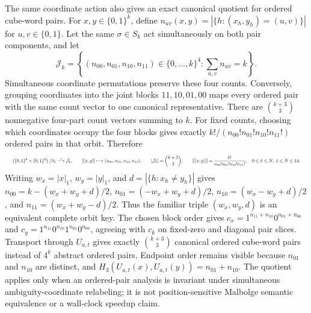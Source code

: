 \documentclass{article}
\newcommand{\fitmath}[1]{\resizebox{0.99\linewidth}{!}{$\displaystyle #1$}}
\begin{document}
The same coordinate action also gives an exact canonical quotient for ordered
cube-word pairs. For $x,y\in\{0,1\}^k$, define
$n_{uv}(x,y)=|\{h:(x_h,y_h)=(u,v)\}|$ for $u,v\in\{0,1\}$. Let the same
$\sigma\in S_k$ act simultaneously on both pair components, and let
\[
  \mathcal{J}_k=\left\{(n_{00},n_{01},n_{10},n_{11})\in
    \{0,\ldots,k\}^4:\sum_{u,v}n_{uv}=k\right\}.
\]
Simultaneous coordinate permutations preserve these four counts. Conversely,
grouping coordinates into the joint blocks $11,10,01,00$ maps every ordered
pair with the same count vector to one canonical representative. There are
$\binom{k+3}{3}$ nonnegative four-part count vectors summing to $k$. For fixed
counts, choosing which coordinates occupy the four blocks gives exactly
$k!/(n_{00}!n_{01}!n_{10}!n_{11}!)$ ordered pairs in that orbit. Therefore
\begin{equation}
  \fitmath{%
    \left(\{0,1\}^k\times\{0,1\}^k\right)/S_k
      \overset{\sim}{\longrightarrow}\mathcal{J}_k,
    \qquad [(x,y)]\longmapsto(n_{00},n_{01},n_{10},n_{11}),
    \qquad |\mathcal{J}_k|=\binom{k+3}{3},
    \qquad |[(x,y)]|=\frac{k!}{n_{00}!n_{01}!n_{10}!n_{11}!},
    \quad 0\leq k\leq N,\ 1\leq N\leq14.
  }
  \label{eq:optimization-crazy-preimage-cube-ordered-pair-quotient}
\end{equation}
Writing $w_x=|x|_1$, $w_y=|y|_1$, and
$d=|\{h:x_h\neq y_h\}|$ gives
$n_{00}=k-(w_x+w_y+d)/2$, $n_{01}=(-w_x+w_y+d)/2$,
$n_{10}=(w_x-w_y+d)/2$, and $n_{11}=(w_x+w_y-d)/2$. Thus the familiar triple
$(w_x,w_y,d)$ is an equivalent complete orbit key. The chosen block order gives
$c_x=1^{n_{11}+n_{10}}0^{n_{01}+n_{00}}$ and
$c_y=1^{n_{11}}0^{n_{10}}1^{n_{01}}0^{n_{00}}$, agreeing with $c_k$ on
fixed-zero and diagonal pair slices. Transport through $U_{a,t}$ gives exactly
$\binom{k+3}{3}$ canonical ordered cube-word pairs instead of $4^k$ abstract
ordered pairs. Endpoint order remains visible because $n_{01}$ and $n_{10}$ are
distinct, and $H_3(U_{a,t}(x),U_{a,t}(y))=n_{01}+n_{10}$. The quotient applies
only when an ordered-pair analysis is invariant under simultaneous
ambiguity-coordinate relabeling; it is not position-sensitive Malbolge semantic
equivalence or a wall-clock speedup claim.
\end{document}
